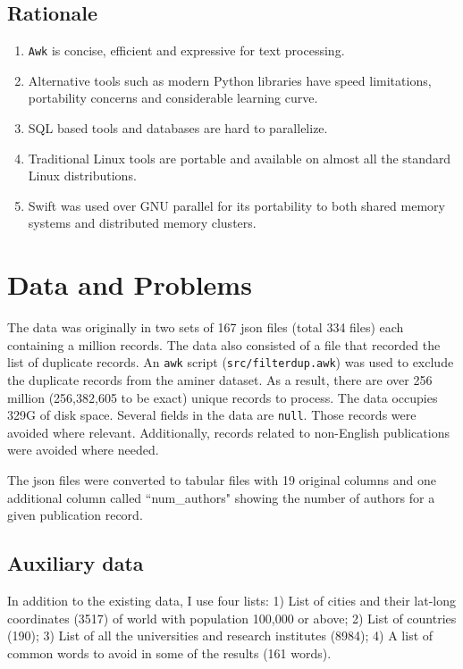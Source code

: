\documentclass{article}
\begin{document}
\subsection*{Rationale}
\begin{enumerate}
\item \texttt{Awk} is concise, efficient and expressive for text processing.
\item Alternative tools such as modern Python libraries have speed limitations, portability concerns and considerable learning curve.
\item SQL based tools and databases are hard to parallelize.
\item Traditional Linux tools are portable and available on almost all the standard Linux distributions.
\item Swift was used over GNU parallel for its portability to both shared memory systems and distributed memory clusters.
\end{enumerate}

\section*{Data and Problems}
The data was originally in two sets of 167 json files (total 334 files) each
containing a million records. The data also consisted of a file that recorded
the list of duplicate records. An \texttt{awk} script (\texttt{src/filterdup.awk}) was used to exclude the
duplicate records from the aminer dataset. As a result, there are over 256
million (256,382,605 to be exact) unique records to process. The data occupies
329G of disk space. Several fields in the data are \texttt{null}. Those records
were avoided where relevant. Additionally, records related to non-English
publications were avoided where needed.

The json files were converted to tabular files with 19 original columns and one
additional column called ``num\_authors" showing the number of authors for a given
publication record.

\subsection*{Auxiliary data}
In addition to the existing data, I use four lists: 1) List of cities and their
lat-long coordinates (3517) of world with population 100,000 or above; 2) List
of countries (190); 3) List of all the universities and research institutes
(8984); 4) A list of common words to avoid in some of the results (161 words).
\end{document}
